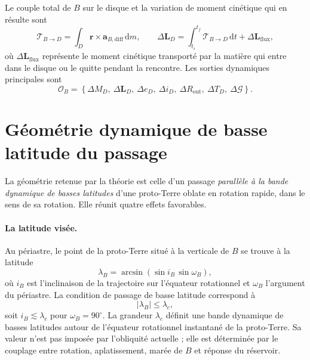 \documentclass[11pt,a4paper,openany]{report}
\newcommand{\dd}{\mathrm{d}}
\begin{document}
Le couple total de $B$ sur le disque et la variation de moment cinétique qui en résulte sont
\begin{equation}
\boldsymbol{\mathcal{T}}_{B\to D}=\int_D\mathbf{r}\times\mathbf{a}_{B,\mathrm{diff}}\,\dd m,
\qquad
\Delta\mathbf{L}_D=\int_{t_i}^{t_f}\boldsymbol{\mathcal{T}}_{B\to D}\,\dd t+\Delta\mathbf{L}_{\mathrm{flux}},
\label{eq:couple}
\end{equation}
où $\Delta\mathbf{L}_{\mathrm{flux}}$ représente le moment cinétique transporté par la matière
qui entre dans le disque ou le quitte pendant la rencontre. Les sorties dynamiques principales
sont
\begin{equation}
\mathcal{O}_B=\left\{\Delta M_D,\ \Delta\mathbf{L}_D,\ \Delta e_D,\ \Delta i_D,\
\Delta R_{\mathrm{out}},\ \Delta T_D,\ \Delta\mathcal{G}\right\}.
\label{eq:OB}
\end{equation}


\section{Géométrie dynamique de basse latitude du passage}
\label{sec:basse-latitude}

La géométrie retenue par la théorie est celle d'un passage \emph{parallèle à la bande
dynamique de basses latitudes} d'une proto-Terre oblate en rotation rapide, dans le sens de sa rotation. Elle
réunit quatre effets favorables.

\paragraph{La latitude visée.}
Au périastre, le point de la proto-Terre situé à la verticale de $B$ se trouve à la latitude
\begin{equation}
\lambda_B=\arcsin\left(\sin i_B\,\sin\omega_B\right),
\label{eq:lambdaB}
\end{equation}
où $i_B$ est l'inclinaison de la trajectoire sur l'équateur rotationnel et $\omega_B$ l'argument
du périastre. La condition de passage de basse latitude correspond à
\begin{equation}
|\lambda_B|\le\lambda_c,
\label{eq:basse-latitude}
\end{equation}
soit $i_B\lesssim\lambda_c$ pour $\omega_B=90^\circ$. La grandeur $\lambda_c$ définit une bande
dynamique de basses latitudes autour de l'équateur rotationnel instantané de la proto-Terre. Sa
valeur n'est pas imposée par l'obliquité actuelle ; elle est déterminée par le couplage entre
rotation, aplatissement, marée de $B$ et réponse du réservoir.
\end{document}
